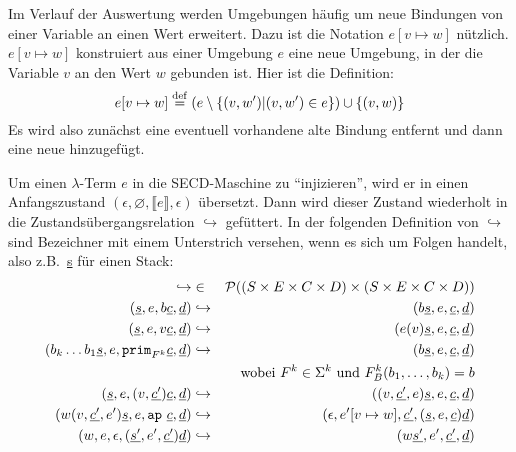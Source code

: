 Im Verlauf der Auswertung werden Umgebungen häufig um neue Bindungen
von einer Variable an einen Wert erweitert.  Dazu ist die Notation
$e[v\mapsto w]$ nützlich.  $e[v\mapsto w]$ konstruiert aus einer
Umgebung $e$ eine neue Umgebung, in der die Variable $v$ an den Wert
$w$ gebunden ist.  Hier ist die Definition:
%
\begin{displaymath}
  e[v\mapsto w] \stackrel{\rm def}{=} (e \setminus \{ (v, w') | (v, w') \in e \}) \cup \{
    (v, w) \}
\end{displaymath}
%
Es wird also zunächst eine eventuell vorhandene alte Bindung entfernt
und dann eine neue hinzugefügt.

Um einen $\lambda$-Term $e$ in die SECD-Maschine zu "`injizieren"',
wird er in einen Anfangszustand $(\epsilon, \varnothing, \llbracket
e\rrbracket, \epsilon)$ übersetzt.  Dann wird dieser Zustand
wiederholt in die Zustandsübergangsrelation $\hookrightarrow$
gefüttert.  In der folgenden Definition von $\hookrightarrow$ sind
Bezeichner mit einem Unterstrich versehen, wenn es sich um Folgen
handelt, also z.B.\ \underline{s} für einen Stack:
%
\begin{eqnarray}
  \hookrightarrow &\in& \mathcal{P}((S\times E\times C\times D) \times (S\times E\times C\times D))\notag\\
  (\underline{s}, e, b\underline{c}, \underline{d})
  &\hookrightarrow& 
  (b\underline{s}, e, \underline{c}, \underline{d})
  \label{secd:base}
  \\
  (\underline{s}, e, v\underline{c}, \underline{d})
  &\hookrightarrow&
  (e(v)\underline{s}, e, \underline{c}, \underline{d})
  \label{secd:variable}
  \\
  (b_k\ldots b_1 \underline{s}, e, \mathtt{prim}_{F^k}\underline{c}, \underline{d})
  &\hookrightarrow&
  (b\underline{s}, e, \underline{c}, \underline{d})
  \label{secd:prim}
  \\ && \textrm{wobei $F^k\in\Sigma^k$ und $F^k_B(b_1,\ldots,b_k) = b$}\notag
  \\
  (\underline{s}, e, (v, \underline{c'}) \underline{c}, \underline{d})
  &\hookrightarrow&
  ((v, \underline{c'}, e) \underline{s}, e, \underline{c}, \underline{d})
  \label{secd:abstraction}
  \\
  (w (v,\underline{c'}, e') \underline{s}, e, \mathtt{ap}~\underline{c}, \underline{d})
  &\hookrightarrow&
  (\epsilon, e'[v\mapsto w], \underline{c'}, (\underline{s}, e, \underline{c}) \underline{d})
  \label{secd:app}
  \\
  (w, e, \epsilon, (\underline{s'}, e', \underline{c'}) \underline{d})
  &\hookrightarrow&
  (w\underline{s'}, e', \underline{c'}, \underline{d})
  \label{secd:return}
\end{eqnarray}
